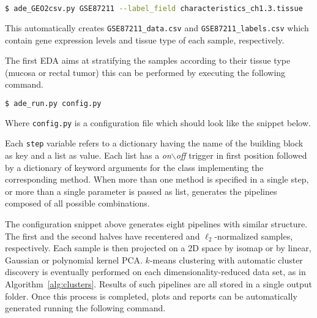 {\small
\begin{lstlisting}[language=bash,caption={ },basicstyle=\ttfamily]
$ ade_GEO2csv.py GSE87211 --label_field characteristics_ch1.3.tissue
\end{lstlisting}
}

\noindent This automatically creates {\tt GSE87211\_data.csv} and {\tt GSE87211\_labels.csv} which contain gene expression levels and tissue type of each sample, respectively.

The first EDA aims at stratifying the samples according to their tissue type (mucosa or rectal tumor) this can be performed by executing the following command.

{\small
\begin{lstlisting}[language=bash,caption={ },basicstyle=\ttfamily]
$ ade_run.py config.py
\end{lstlisting}
}

\noindent Where {\tt config.py} is a configuration file which should look like the snippet below.




\noindent Each \texttt{step} variable refers to a dictionary having the name of the building block as key and a list as value. Each list has a \emph{on$\backslash$off} trigger in first position followed by a dictionary of keyword arguments for the class implementing the corresponding method. When more than one method is specified in a single step, or more than a single parameter is passed as {list}, \ade generates the pipelines composed of all possible combinations.

The configuration snippet above generates eight pipelines with similar structure. The first and the second halves have recentered and $\ell_2$-normalized samples, respectively. Each sample is then projected on a 2D space by isomap or by linear, Gaussian or polynomial kernel PCA. $k$-means clustering with automatic cluster discovery is eventually performed on each dimensionality-reduced data set, as in Algorithm~\ref{alg:clusters}.
Results of such pipelines are all stored in a single output folder. Once this process is completed, plots and reports can be automatically generated running the following command.

